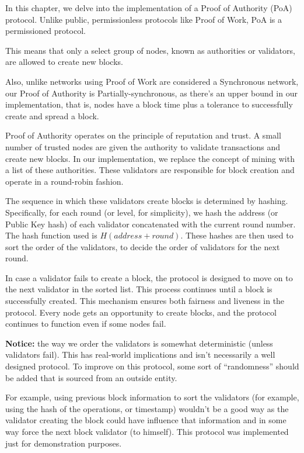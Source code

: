 In this chapter, we delve into the implementation of a Proof of Authority (PoA) protocol. Unlike public, permissionless protocols like Proof of Work, PoA is a permissioned protocol. 

This means that only a select group of nodes, known as authorities or validators, are allowed to create new blocks.

Also, unlike networks using Proof of Work are considered a Synchronous network, our Proof of Authority is Partially-synchronous, as there's an upper bound in our implementation, that is, nodes have a block time plus a tolerance to successfully create and spread a block.

Proof of Authority operates on the principle of reputation and trust. A small number of trusted nodes are given the authority to validate transactions and create new blocks. In our implementation, we replace the concept of mining with a list of these authorities. These validators are responsible for block creation and operate in a round-robin fashion.

The sequence in which these validators create blocks is determined by hashing. Specifically, for each round (or level, for simplicity), we hash the address (or Public Key hash) of each validator concatenated with the current round number. The hash function used is $H(address + round)$. These hashes are then used to sort the order of the validators, to decide the order of validators for the next round.

In case a validator fails to create a block, the protocol is designed to move on to the next validator in the sorted list. This process continues until a block is successfully created. This mechanism ensures both fairness and liveness in the protocol. Every node gets an opportunity to create blocks, and the protocol continues to function even if some nodes fail.

\textbf{Notice:} the way we order the validators is somewhat deterministic (unless validators fail). This has real-world implications and isn't necessarily a well designed protocol. 
To improve on this protocol, some sort of ``randomness'' should be added that is sourced from an outside entity.

For example, using previous block information to sort the validators (for example, using the hash of the operations, or timestamp) wouldn't be a good way as the validator creating the block could have influence that information and in some way force the next block validator (to himself). This protocol was implemented just for demonstration purposes.

